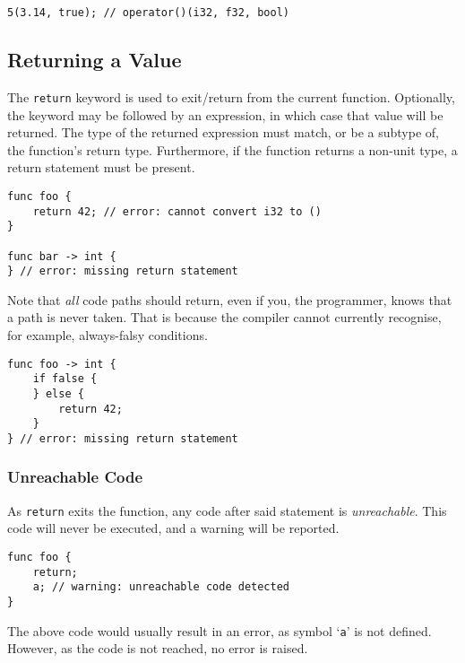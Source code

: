 \begin{lstlisting}[language=CustomLang]
5(3.14, true); // operator()(i32, f32, bool)
\end{lstlisting}

\subsection{Returning a Value}

The \texttt{return} keyword is used to exit/return from the current function.
Optionally, the keyword may be followed by an expression, in which case that value will be returned.
The type of the returned expression must match, or be a subtype of, the function's return type.
Furthermore, if the function returns a non-unit type, a return statement must be present.

\begin{lstlisting}[language=CustomLang]
func foo {
    return 42; // error: cannot convert i32 to ()
}

func bar -> int {
} // error: missing return statement
\end{lstlisting}

Note that \textit{all} code paths should return, even if you, the programmer, knows that a path is never taken.
That is because the compiler cannot currently recognise, for example, always-falsy conditions.

\begin{lstlisting}[language=CustomLang]
func foo -> int {
    if false {
    } else {
        return 42;
    }
} // error: missing return statement
\end{lstlisting}

\subsubsection{Unreachable Code}

As \texttt{return} exits the function, any code after said statement is \textit{unreachable}.
This code will never be executed, and a warning will be reported.

\begin{lstlisting}[language=CustomLang]
func foo {
    return;
    a; // warning: unreachable code detected
}
\end{lstlisting}

The above code would usually result in an error, as symbol `\texttt{a}' is not defined.
However, as the code is not reached, no error is raised.

